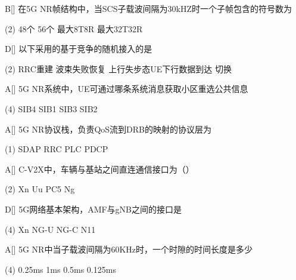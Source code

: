 \begin{choice}{B}[]
	在5G NR帧结构中，当SCS子载波间隔为30kHZ时一个子帧包含的符号数为
	\begin{tasks}(2)
		\task 48个
		\task 56个
		\task 最大8T8R
		\task 最大32T32R
	\end{tasks}
\end{choice}



\begin{choice}{D}[]
	以下采用的基于竞争的随机接入的是
	\begin{tasks}(2)
		\task RRC重建
		\task 波束失败恢复
		\task 上行失步态UE下行数据到达
		\task 切换
	\end{tasks}
\end{choice}

\begin{choice}{A}[]
	5G NR系统中，UE可通过哪条系统消息获取小区重选公共信息
	\begin{tasks}(4)
		\task SIB4
		\task SIB1
		\task SIB3
		\task SIB2
	\end{tasks}
\end{choice}


\begin{choice}{A}[]
	5G NR协议栈，负责QoS流到DRB的映射的协议层为
	\begin{tasks}(1)
		\task SDAP
		\task RRC
		\task PLC
		\task PDCP
	\end{tasks}
\end{choice}



\begin{choice}{A}[]
	C-V2X中，车辆与基站之间直连通信接口为（）
	\begin{tasks}(2)
		\task Xn
		\task Uu
		\task PC5
		\task Ng
	\end{tasks}
\end{choice}



\begin{choice}{D}[]
	5G网络基本架构，AMF与gNB之间的接口是
	\begin{tasks}(4)
		\task Xn
		\task NG-U
		\task NG-C
		\task N11
	\end{tasks}
\end{choice}




\begin{choice}{A}[]
	5G NR中当子载波间隔为60KHz时，一个时隙的时间长度是多少
	\begin{tasks}(4)
		\task 0.25ms
		\task 1ms
		\task 0.5ms
		\task 0.125ms
	\end{tasks}
\end{choice}

